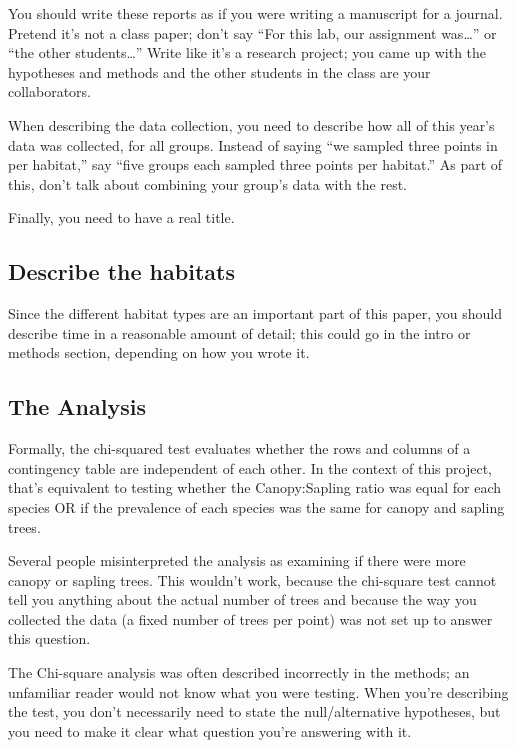 \documentclass[]{book}
\begin{document}
You should write these reports as if you were writing a manuscript for a
journal. Pretend it's not a class paper; don't say ``For this lab, our
assignment was\ldots{}'' or ``the other students\ldots{}'' Write like
it's a research project; you came up with the hypotheses and methods and
the other students in the class are your collaborators.

When describing the data collection, you need to describe how all of
this year's data was collected, for all groups. Instead of saying ``we
sampled three points in per habitat,'' say ``five groups each sampled
three points per habitat.'' As part of this, don't talk about combining
your group's data with the rest.

Finally, you need to have a real title.

\subsection{Describe the habitats}\label{describe-the-habitats}

Since the different habitat types are an important part of this paper,
you should describe time in a reasonable amount of detail; this could go
in the intro or methods section, depending on how you wrote it.

\subsection{The Analysis}\label{the-analysis}

Formally, the chi-squared test evaluates whether the rows and columns of
a contingency table are independent of each other. In the context of
this project, that's equivalent to testing whether the Canopy:Sapling
ratio was equal for each species OR if the prevalence of each species
was the same for canopy and sapling trees.

Several people misinterpreted the analysis as examining if there were
more canopy or sapling trees. This wouldn't work, because the chi-square
test cannot tell you anything about the actual number of trees and
because the way you collected the data (a fixed number of trees per
point) was not set up to answer this question.

The Chi-square analysis was often described incorrectly in the methods;
an unfamiliar reader would not know what you were testing. When you're
describing the test, you don't necessarily need to state the
null/alternative hypotheses, but you need to make it clear what question
you're answering with it.
\end{document}
